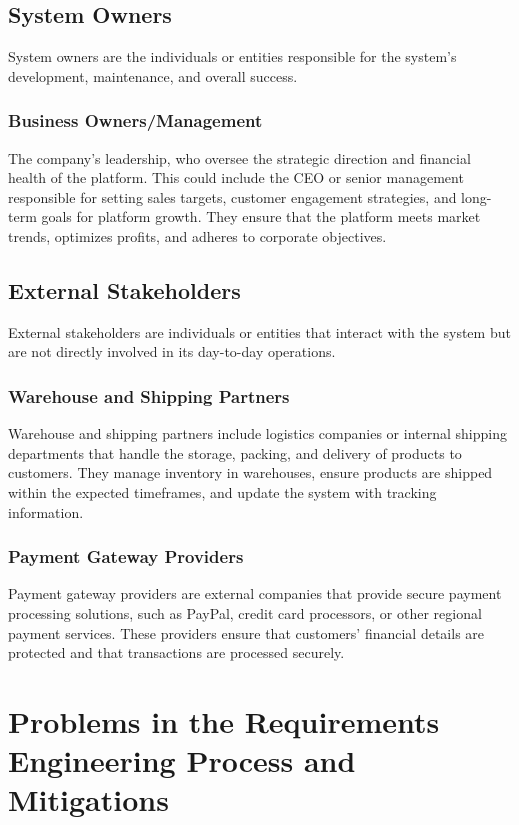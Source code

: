 \documentclass[a4paper,journal]{IEEEtran}
\begin{document}
\subsection{System Owners}
System owners are the individuals or entities responsible for the system's
development, maintenance, and overall success.

\subsubsection{Business Owners/Management}
The company's leadership, who oversee the strategic direction and financial
health of the platform.
This could include the CEO or senior management
responsible for setting sales targets, customer engagement strategies, and
long-term goals for platform growth.
They ensure that the platform meets market
trends, optimizes profits, and adheres to corporate objectives.

\subsection{External Stakeholders}
External stakeholders are individuals or entities that interact with the system
but are not directly involved in its day-to-day operations.

\subsubsection{Warehouse and Shipping Partners}
Warehouse and shipping partners include logistics companies or internal shipping
departments that handle the storage, packing, and delivery of products to
customers.
They manage inventory in warehouses, ensure products are shipped within the
expected timeframes, and update the system with tracking information.

\subsubsection{Payment Gateway Providers}
Payment gateway providers are external companies that provide secure payment
processing solutions, such as PayPal, credit card processors, or other regional
payment services.
These providers ensure that customers' financial details are protected and that
transactions are processed securely.

\section{Problems in the Requirements Engineering Process and Mitigations}
\end{document}
